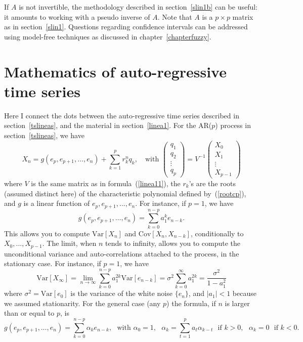 \documentclass[oneside,10pt]{book}
\begin{document}
If $A$ is not invertible, the methodology described in section~\ref{slin1b} can be useful: it amounts to working with a pseudo inverse of $A$. Note that $A$ is a $p \times p$ matrix as in section~\ref{slin1}. Questions regarding confidence intervals can be addressed using model-free techniques as discussed in chapter~\ref{chapterfuzzy}. 
  
\section{Mathematics of auto-regressive time series}\label{linearar}

Here I connect the dots between the auto-regressive \textcolor{index}{time series} described in section~\ref{tslineas}, and the material in section~\ref{linea1}. For the AR($p$) process in section~\ref{tslineas}, we have
$$
X_n = g(e_p,e_{p+1},\dots,e_n)+\sum_{k=1}^p r_k^n q_k, \quad \text{with }
\left(
\begin{array}{c}
q_1 \\
q_2 \\
\vdots \\
q_p
\end{array}
\right)
=V^{-1} 
\left(
\begin{array}{c}
X_0 \\
X_1 \\
\vdots \\
X_{p-1}
\end{array}
\right)
$$
where $V$ is the same matrix as in formula~(\ref{linea11}), the $r_k$'s are the roots (assumed distinct here) of the 
\textcolor{index}{characteristic polynomial} defined by~(\ref{rootcp}), and $g$ is a linear function of $e_p, e_{p+1}, ..., e_n$. For instance, if $p = 1$, we have
$$
g(e_p,e_{p+1},\dots,e_n)=\sum_{k=0}^{n-p}a_1^k e_{n-k}.
$$
This allows you to compute $\text{Var}[X_n]$ and $\text{Cov}[X_n, X_{n-k}]$, conditionally to  $X_0, ..., X_{p-1}$. The limit, when $n$ tends to infinity, allows you to compute the unconditional variance and auto-correlations attached to the process, in the stationary case. For instance, if $p = 1$, we have
$$
\text{Var}[X_\infty]=\lim_{n\rightarrow\infty}\sum_{k=0}^{n-p} a_1^{2k} \text{Var}[e_{n-k}] =\sigma^2\sum_{k=0}^\infty a_1^{2k}=\frac{\sigma^2}{1-a_1^2}
$$
where $\sigma^2=\text{Var}[e_0]$ is the variance of the white noise $\{e_n\}$, and $|a_1| < 1$ because we assumed stationarity.  For the general case (any $p$) the formula, if $n$ is larger than or equal to $p$, is 
$$
g(e_p,e_{p+1},\dots,e_n)=\sum_{k=0}^{n-p}\alpha_k e_{n-k},  \text{ } \text{with }\alpha_0 =1,  \text{ } \alpha_k=\sum_{t=1}^p a_t \alpha_{k-t} \text{ }  \text{if } k>0, \text{ } \alpha_k=0 \text{ } \text{if } k<0.
$$
\end{document}
